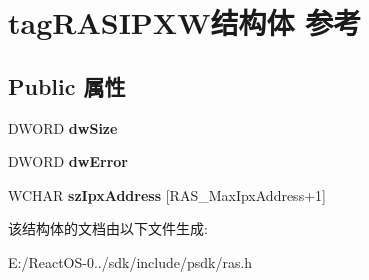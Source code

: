\hypertarget{structtag_r_a_s_i_p_x_w}{}\section{tag\+R\+A\+S\+I\+P\+X\+W结构体 参考}
\label{structtag_r_a_s_i_p_x_w}
\subsection*{Public 属性}
\begin{DoxyCompactItemize}
\item 
\mbox{\label{structtag_r_a_s_i_p_x_w_a26e7b4fcc0b83a612c4d7400736660b1}} 
D\+W\+O\+RD {\bfseries dw\+Size}
\item 
\mbox{\label{structtag_r_a_s_i_p_x_w_a7f3b0067ce929aca98d9a089aaa0efce}} 
D\+W\+O\+RD {\bfseries dw\+Error}
\item 
\mbox{\label{structtag_r_a_s_i_p_x_w_aeab13ae01c9646cbbcbcd275560ea05f}} 
W\+C\+H\+AR {\bfseries sz\+Ipx\+Address} \mbox{[}R\+A\+S\+\_\+\+Max\+Ipx\+Address+1\mbox{]}
\end{DoxyCompactItemize}


该结构体的文档由以下文件生成\+:\begin{DoxyCompactItemize}
\item 
E\+:/\+React\+O\+S-\/0../sdk/include/psdk/ras.\+h\end{DoxyCompactItemize}
